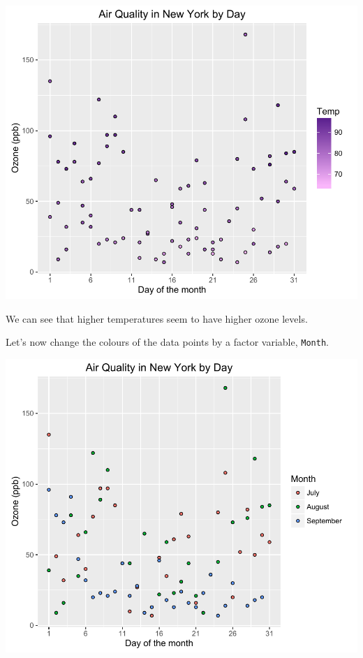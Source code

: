 \begin{center}\includegraphics[width=0.6\linewidth]{5_Scatter_Plots_pdf/scatter_8-1} \end{center}

We can see that higher temperatures seem to have higher ozone levels.

Let's now change the colours of the data points by a factor variable,
\texttt{Month}.

\begin{Shaded}
\begin{Highlighting}[]
\StringTok{ }\NormalTok{(}   \StringTok{ }
\StringTok{  }\NormalTok{(} \NormalTok{) +}
\StringTok{  }\NormalTok{(}\NormalTok{) +}\StringTok{ }
\StringTok{  }\NormalTok{(} \NormalTok{, } \NormalTok{) +}
\StringTok{  }\NormalTok{(} \NormalTok{(}\NormalTok{, }\NormalTok{, }\NormalTok{))}
\end{Highlighting}
\end{Shaded}

\begin{center}\includegraphics[width=0.6\linewidth]{5_Scatter_Plots_pdf/scatter_9-1} \end{center}

